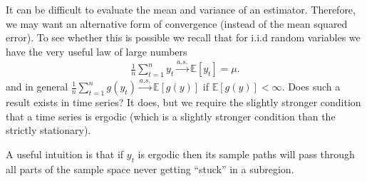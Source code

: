 It can be difficult to evaluate the mean and variance of an estimator. Therefore, we may want
an alternative form of convergence (instead of the mean squared error). To see whether this is
possible we recall that for i.i.d random variables we have the very useful law of large numbers
\begin{gather*}
    \frac{1}{n} \sum_{t=1}^{n} y_t \xrightarrow{a.s.} \mathbb{E}[y_t] = \mu.
\end{gather*}
and in general $\frac{1}{n} \sum_{t=1}^{n} g(y_t) \xrightarrow{a.s.} \mathbb{E}[g(y)]$ if $\mathbb{E}[g(y)] < \infty$.
Does such a result exists in time series? 
It does, but we require the slightly stronger condition that a time series is ergodic 
(which is a slightly stronger condition than the strictly stationary).


A useful intuition is that if $y_t$ is ergodic then its sample paths will pass through all parts of the sample
space never getting ``stuck'' in a subregion. 



